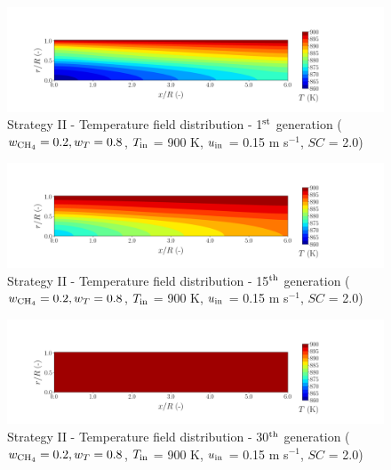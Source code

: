 \documentclass[preprint,12pt]{elsarticle}
\begin{document}
\begin{figure}[h!]
\centering
\includegraphics[width=190mm]{results/5Eq/20C_80T/GEN1-TFIELD.png}
\caption{\label{fig:5RES2080G1-TField} Strategy II - Temperature field distribution - 1$^{\rm{st}}$ generation ($w_{\rm{CH_4}} = 0.2, w_T = 0.8$, $T_{\rm{in}}$ = 900 K, $u_{\rm{in}}$ = 0.15 m s$^{-1}$, $SC$ = 2.0)}
\end{figure}

\begin{figure}[h!]
\centering
\includegraphics[width=190mm]{results/5Eq/20C_80T/GEN15-TFIELD.png}
\caption{\label{fig:5RES2080G15-TField} Strategy II - Temperature field distribution - 15$^{\rm{th}}$ generation ($w_{\rm{CH_4}} = 0.2, w_T = 0.8$, $T_{\rm{in}}$ = 900 K, $u_{\rm{in}}$ = 0.15 m s$^{-1}$, $SC$ = 2.0)}
\end{figure}

\begin{figure}[h!]
\centering
\includegraphics[width=190mm]{results/5Eq/20C_80T/GEN30-TFIELD.png}
\caption{\label{fig:5RES2080G30-TField} Strategy II - Temperature field distribution - 30$^{\rm{th}}$ generation ($w_{\rm{CH_4}} = 0.2, w_T = 0.8$, $T_{\rm{in}}$ = 900 K, $u_{\rm{in}}$ = 0.15 m s$^{-1}$, $SC$ = 2.0)}
\end{figure}
\end{document}
